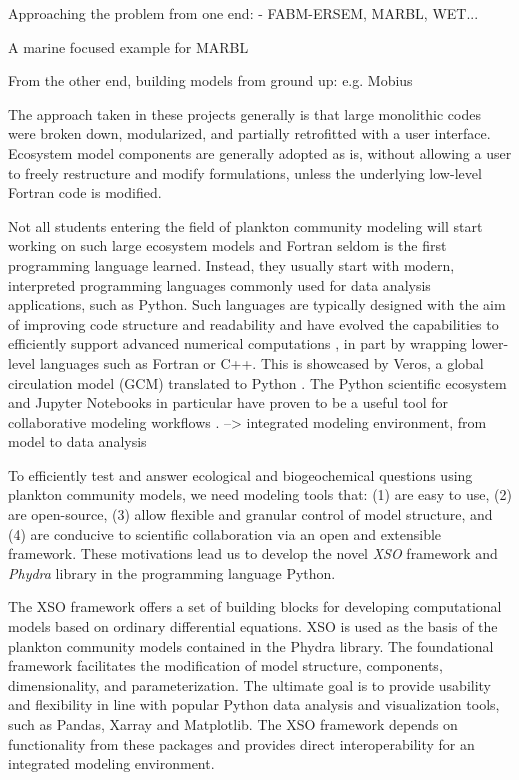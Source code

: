 \documentclass[journal abbreviation, manuscript]{copernicus}
\begin{document}
Approaching the problem from one end:
- FABM-ERSEM, MARBL, WET...

A marine focused example for MARBL \citep{Long2021SimulationsMARBL}

From the other end, building models from ground up: 
e.g. Mobius \citep{Norling2021RapidV1.0}

The approach taken in these projects generally is that large monolithic codes were broken down, modularized, and partially retrofitted with a user interface. Ecosystem model components are generally adopted as is, without allowing a user to freely restructure and modify formulations, unless the underlying low-level Fortran code is modified.

Not all students entering the field of plankton community modeling will start working on such large ecosystem models and Fortran seldom is the first programming language learned. Instead, they usually start with modern, interpreted programming languages commonly used for data analysis applications, such as Python. Such languages are typically designed with the aim of improving code structure and readability and have evolved the capabilities to efficiently support advanced numerical computations \citep{Lin2012}, in part by wrapping lower-level languages such as Fortran or C++. This is showcased by Veros, a global circulation model (GCM) translated to Python \citep{Hafner2018VerosPython}. The Python scientific ecosystem and Jupyter Notebooks in particular \citep{Kluyver2016JupyterWorkflows} have proven to be a useful tool for collaborative modeling workflows \citep[e.g. eWaterCycle platform,][]{Hut2022TheCollaboration}. 
--> integrated modeling environment, from model to data analysis

To efficiently test and answer ecological and biogeochemical questions using plankton community models, we need modeling tools that: (1) are easy to use, (2) are open-source, (3) allow flexible and granular control of model structure, and (4) are conducive to scientific collaboration via an open and extensible framework. These motivations lead us to develop the novel \textit{XSO} framework and \textit{Phydra} library in the programming language Python. 

The XSO framework offers a set of building blocks for developing computational models based on ordinary differential equations. XSO is used as the basis of the plankton community models contained in the Phydra library. The foundational framework facilitates the modification of model structure, components, dimensionality, and parameterization. The ultimate goal is to provide usability and flexibility in line with popular Python data analysis and visualization tools, such as Pandas, Xarray and Matplotlib. The XSO framework depends on functionality from these packages and provides direct interoperability for an integrated modeling environment.
\end{document}
